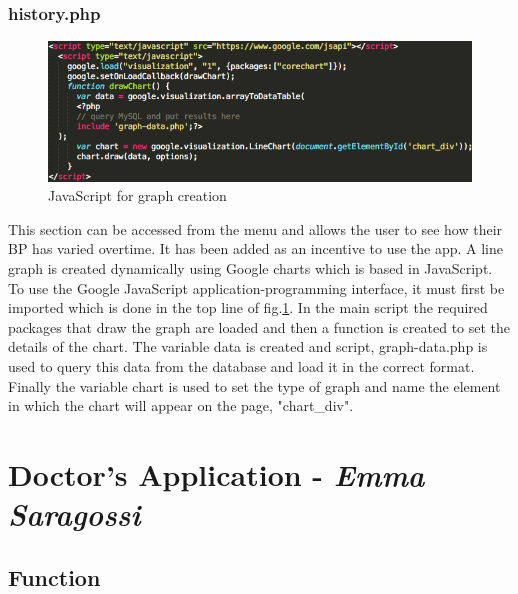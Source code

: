 \documentclass[11pt]{article}
\begin{document}

\subsubsection{history.php}
 
\begin{figure}
\centering 
\includegraphics[width=0.95\linewidth]{historyJS.png}
\caption{JavaScript for graph creation \label{historyJS}}
\endminipage\hfill
\end{figure} 
This section can be accessed from the menu and allows the user to see how their BP has varied overtime. It has been added as an incentive to use the app. A line graph is created dynamically using Google charts \cite{chart} which is based in JavaScript. To use the Google JavaScript application-programming interface, it must first be imported which is done in the top line of fig.\ref{historyJS}. In the main script the required packages that draw the graph are loaded and then a function is created to set the details of the chart. The variable data is created and script, graph-data.php is used to query this data from the database and load it in the correct format. Finally the variable chart is used to set the type of graph and name the element in which the chart will appear on the page, "chart\_div". 


\section{Doctor's Application - \textit{Emma Saragossi}}

\subsection{Function}
\end{document}
